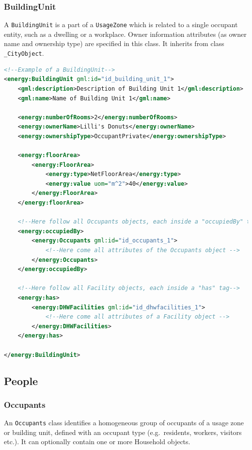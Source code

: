 \documentclass[a4paper,12pt]{article}
\begin{document}
\subsubsection{BuildingUnit}\label{buildingunit}

A \lstinline!BuildingUnit! is a part of a \lstinline!UsageZone! which is
related to a single occupant entity, such as a dwelling or a workplace.
Owner information attributes (as owner name and ownership type) are
specified in this class. It inherits from class \lstinline!_CityObject!.

\begin{lstlisting}[language=XML]
<!--Example of a BuildingUnit-->
<energy:BuildingUnit gml:id="id_building_unit_1">
    <gml:description>Description of Building Unit 1</gml:description>
    <gml:name>Name of Building Unit 1</gml:name>

    <energy:numberOfRooms>2</energy:numberOfRooms>
    <energy:ownerName>Lilli's Donuts</energy:ownerName>
    <energy:ownershipType>OccupantPrivate</energy:ownershipType>

    <energy:floorArea>
        <energy:FloorArea>
            <energy:type>NetFloorArea</energy:type>
            <energy:value uom="m^2">40</energy:value>
        </energy:FloorArea>
    </energy:floorArea>

    <!--Here follow all Occupants objects, each inside a "occupiedBy" tag-->
    <energy:occupiedBy>
        <energy:Occupants gml:id="id_occupants_1">
            <!--Here come all attributes of the Occupants object -->
        </energy:Occupants>
    </energy:occupiedBy>

    <!--Here follow all Facility objects, each inside a "has" tag-->
    <energy:has>
        <energy:DHWFacilities gml:id="id_dhwfacilities_1">
            <!--Here come all attributes of a Facility object -->
        </energy:DHWFacilities>
    </energy:has>

</energy:BuildingUnit>
\end{lstlisting}

\subsection{People}\label{people}

\subsubsection{Occupants}\label{occupants}

An \lstinline!Occupants! class identifies a homogeneous group of
occupants of a usage zone or building unit, defined with an occupant
type (e.g.~residents, workers, visitors etc.). It can optionally contain
one or more Household objects.
\end{document}
